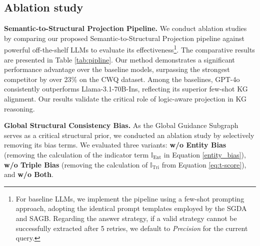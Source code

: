 \documentclass[11pt]{article}
\begin{document}
\subsection{Ablation study}
\textbf{Semantic-to-Structural Projection Pipeline.} We conduct ablation studies by comparing our proposed Semantic-to-Structural Projection pipeline against powerful off-the-shelf LLMs to evaluate its effectiveness\footnote{For baseline LLMs, we implement the pipeline using a few-shot prompting approach, adopting the identical prompt templates employed by the SGDA and SAGB. Regarding the answer strategy, if a valid strategy cannot be successfully extracted after 5 retries, we default to \textit{Precision} for the current query.}. The comparative results are presented in Table \ref{tab:pipline}. Our method demonstrates a significant performance advantage over the baseline models, surpassing the strongest competitor by over 23\% on the CWQ dataset. Among the baselines, GPT-4o consistently outperforms Llama-3.1-70B-Ins, reflecting its superior few-shot KG alignment. Our results validate the critical role of logic-aware projection in KG reasoning. 

\begin{table}[t]
\footnotesize
\centering
\renewcommand{\arraystretch}{1.15} %
\setlength{\tabcolsep}{2pt} 

\caption{Comparison of different Question Planing Pipelines.}
\label{tab:pipline}
\end{table}

\textbf{Global Structural Consistency Bias.} As the Global Guidance Subgraph serves as a critical structural prior, we conducted an ablation study by selectively removing its bias terms. We evaluated three variants: \textbf{w/o Entity Bias} (removing the calculation of the indicator term \( \mathbb{I}_\text{Ent} \) in Equation \ref{entity_bias}), \textbf{w/o Triple Bias} (removing the calculation of \( \mathbb{I}_\text{Tri} \) from Equation \ref{eq:t-score}), and \textbf{w/o Both}. 
\end{document}
